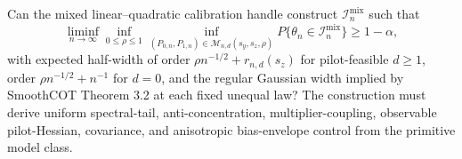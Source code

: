 Can the mixed linear--quadratic calibration handle construct \(\mathcal I_n^{\mathrm{mix}}\) such that \[\liminf_{n\to\infty}\inf_{0\le\rho\le1}\inf_{(P_{0,n},P_{1,n})\in\mathcal M_{n,d}(s_y,s_z,\rho)}P\{\theta_n\in\mathcal I_n^{\mathrm{mix}}\}\ge1-\alpha,\] with expected half-width of order \(\rho n^{-1/2}+r_{n,d}(s_z)\) for pilot-feasible \(d\ge1\), order \(\rho n^{-1/2}+n^{-1}\) for \(d=0\), and the regular Gaussian width implied by SmoothCOT Theorem 3.2 at each fixed unequal law? The construction must derive uniform spectral-tail, anti-concentration, multiplier-coupling, observable pilot-Hessian, covariance, and anisotropic bias-envelope control from the primitive model class.